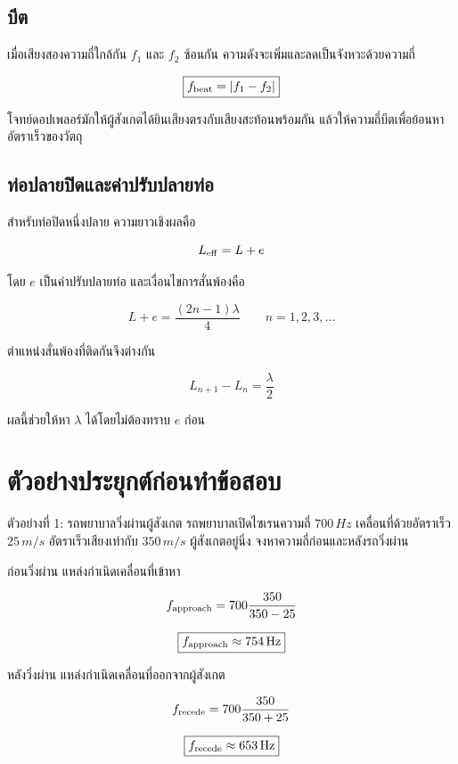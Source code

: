 \subsection{บีต}

เมื่อเสียงสองความถี่ใกล้กัน $f_1$ และ $f_2$ ซ้อนกัน ความดังจะเพิ่มและลดเป็นจังหวะด้วยความถี่

\[
\boxed{f_{\rm beat}=|f_1-f_2|}
\]

โจทย์ดอปเพลอร์มักให้ผู้สังเกตได้ยินเสียงตรงกับเสียงสะท้อนพร้อมกัน แล้วให้ความถี่บีตเพื่อย้อนหาอัตราเร็วของวัตถุ

\subsection{ท่อปลายปิดและค่าปรับปลายท่อ}

สำหรับท่อปิดหนึ่งปลาย ความยาวเชิงผลคือ

\[
L_{\rm eff}=L+e
\]

โดย $e$ เป็นค่าปรับปลายท่อ และเงื่อนไขการสั่นพ้องคือ

\[
\boxed{
L+e=\frac{(2n-1)\lambda}{4}
\qquad n=1,2,3,\ldots
}
\]

ตำแหน่งสั่นพ้องที่ติดกันจึงต่างกัน

\[
\boxed{L_{n+1}-L_n=\frac{\lambda}{2}}
\]

ผลนี้ช่วยให้หา $\lambda$ ได้โดยไม่ต้องทราบ $e$ ก่อน

\section{ตัวอย่างประยุกต์ก่อนทำข้อสอบ}

\begin{examplebox}{ตัวอย่างที่ 1: รถพยาบาลวิ่งผ่านผู้สังเกต}
รถพยาบาลเปิดไซเรนความถี่ $700\,\si{Hz}$ เคลื่อนที่ด้วยอัตราเร็ว $25\,\si{m/s}$ อัตราเร็วเสียงเท่ากับ $350\,\si{m/s}$ ผู้สังเกตอยู่นิ่ง จงหาความถี่ก่อนและหลังรถวิ่งผ่าน

ก่อนวิ่งผ่าน แหล่งกำเนิดเคลื่อนที่เข้าหา

\[
f_{\rm approach}
=700\frac{350}{350-25}
\]

\[
\boxed{f_{\rm approach}\approx754\,\si{Hz}}
\]

หลังวิ่งผ่าน แหล่งกำเนิดเคลื่อนที่ออกจากผู้สังเกต

\[
f_{\rm recede}
=700\frac{350}{350+25}
\]

\[
\boxed{f_{\rm recede}\approx653\,\si{Hz}}
\]
\end{examplebox}

